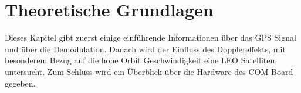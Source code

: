 \chapter{Theoretische Grundlagen}
Dieses Kapitel gibt zuerst einige einführende Informationen über das GPS Signal und über die Demodulation. Danach wird der Einfluss des Dopplereffekts, mit besonderem Bezug auf die hohe Orbit Geschwindigkeit eine \gls{LEO} Satelliten untersucht. Zum Schluss wird ein Überblick über die Hardware des COM Board gegeben.









